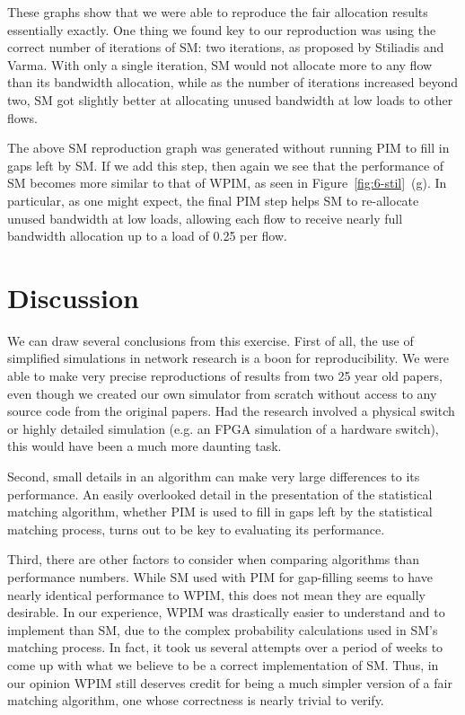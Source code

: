 These graphs show that we were able to reproduce the fair allocation results essentially exactly. One thing we found key to our reproduction was using the correct number of iterations of SM: two iterations, as proposed by Stiliadis and Varma. With only a single iteration, SM would not allocate more to any flow than its bandwidth allocation, while as the number of iterations increased beyond two, SM got slightly better at allocating unused bandwidth at low loads to other flows.

The above SM reproduction graph was generated without running PIM to fill in gaps left by SM. If we add this step, then again we see that the performance of SM becomes more similar to that of WPIM, as seen in Figure~\ref{fig:6-stil}~(g). In particular, as one might expect, the final PIM step helps SM to re-allocate unused bandwidth at low loads, allowing each flow to receive nearly full bandwidth allocation up to a load of 0.25 per flow.

\section{Discussion}
We can draw several conclusions from this exercise. First of all, the use of simplified simulations in network research is a boon for reproducibility. We were able to make very precise reproductions of results from two 25 year old papers, even though we created our own simulator from scratch without access to any source code from the original papers. Had the research involved a physical switch or highly detailed simulation (e.g. an FPGA simulation of a hardware switch), this would have been a much more daunting task.

Second, small details in an algorithm can make very large differences to its performance. An easily overlooked detail in the presentation of the statistical matching algorithm, whether PIM is used to fill in gaps left by the statistical matching process, turns out to be key to evaluating its performance.

Third, there are other factors to consider when comparing algorithms than performance numbers. While SM used with PIM for gap-filling seems to have nearly identical performance to WPIM, this does not mean they are equally desirable. In our experience, WPIM was drastically easier to understand and to implement than SM, due to the complex probability calculations used in SM's matching process. In fact, it took us several attempts over a period of weeks to come up with what we believe to be a correct implementation of SM. Thus, in our opinion WPIM still deserves credit for being a much simpler version of a fair matching algorithm, one whose correctness is nearly trivial to verify.

